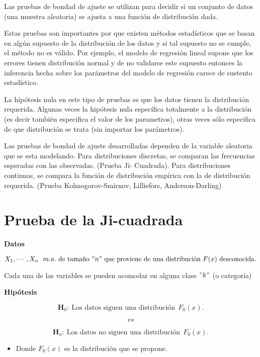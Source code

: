 \documentclass[
  a4paper,
  oneside,
  openany]{book}
\providecommand{\tightlist}{%
  \setlength{\itemsep}{0pt}\setlength{\parskip}{0pt}}
\begin{document}
Las pruebas de bondad de ajuste se utilizan para decidir si un conjunto de datos (una muestra aleatoria) se ajusta a una función de distribución dada.

Estas pruebas son importantes por que existen métodos estadísticos que se basan en algún supuesto de la distribución de los datos y si tal supuesto no se cumple, el método no es válido. Por ejemplo, el modelo de regresión lineal supone que los errores tienen distribución normal y de no validarse este supuesto entonces la inferencia hecha sobre los parámetros del modelo de regresión carece de sustento estadístico.

La hipótesis nula en este tipo de pruebas es que los datos tienen la distribución requerida. Algunas veces la hipótesis nula específica totalmente a la distribución (es decir también especifica el valor de los parametros), otras veces sólo especifica de que distribución se trata (sin importar los parámetros).

Las pruebas de bondad de ajuste desarrolladas dependen de la variable aleatoria que se esta modelando. Para distribuciones discretas, se comparan las frecuencias esperadas con las observadas. (Prueba Ji-
Cuadrada). Para distribuciones continuas, se compara la función de distribución empírica con la de distribución requerida. (Prueba Kolmogorov-Smirnov, Lilliefors, Anderson-Darling)

\hypertarget{prueba-de-la-ji-cuadrada}{%
\chapter{Prueba de la Ji-cuadrada}\label{prueba-de-la-ji-cuadrada}}

\textbf{Datos}

\[X_{1},\cdots,X_{n} \ \ m.a. \  \mbox{de tamaño} \  "n"\  \mbox{que proviene de una distribución} \  F(x) \  \mbox{desconocida.}\]

Cada una de las variables se pueden acomodar en alguna clase \("k"\) (o categoría)

\textbf{Hipótesis}

\[\textbf{H}_0: \ \mbox{Los datos siguen una distribución} \ \  F_{0}(x).\]

\[vs\]

\[\textbf{H}_a: \ \mbox{Los datos no siguen una distribución} \ \ F_{0}(x).\]

\begin{itemize}
\tightlist
\item
  Donde \(F_{0}(x)\) es la distribución que se propone.
\end{itemize}
\end{document}
